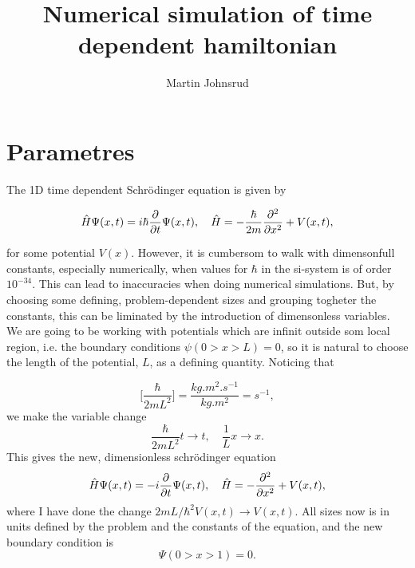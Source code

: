 \documentclass{article}
\title{Numerical simulation of time dependent hamiltonian}
\author{Martin Johnsrud}
\begin{document}
\maketitle

\section*{Parametres}

    The 1D time dependent Schrödinger equation is given by

    \begin{equation*}
        \hat H \Psi(x, t) = i \hbar \pdv{t} \Psi(x, t), \quad \hat H = -\frac{\hbar}{2m}\pdv[2]{x} + V(x, t),
    \end{equation*}

    for some potential $V(x)$. However, it is cumbersom to walk with dimensonfull constants, especially numerically, when values for $\hbar$ in the si-system is of order $10^{-34}$. This can lead to inaccuracies when doing numerical simulations. But, by choosing some defining, problem-dependent sizes and grouping togheter the constants, this can be liminated by the introduction of dimensonless variables. We are going to be working with potentials which are infinit outside som local region, i.e. the boundary conditions $\psi(0>x>L) = 0$, so it is natural to choose the length of the potential, $L$, as a defining quantity. Noticing that

    \begin{equation*}
        \bigg[\frac{\hbar}{2 m L^2} \bigg] = \frac{\si{kg.m^2.s^{-1}}}{\si{kg.m^2}} = \si{s^{-1}},
    \end{equation*}
    we make the variable change
    \begin{equation*}
        \frac{\hbar}{2 m L^2}t \rightarrow t, \quad \frac{1}{L}x \rightarrow x.
    \end{equation*}
    This gives the new, dimensionless schrödinger equation
    \begin{equation}
        \hat H \Psi(x, t) = -i \pdv{t} \Psi(x, t), \quad \hat H = -\pdv[2]{x} + V(x, t),
        \label{time_depend}
    \end{equation}
    where I have done the change $2mL/\hbar^2V(x, t) \rightarrow V(x, t)$. All sizes now is in units defined by the problem and the constants of the equation, and the new boundary condition is 
    \begin{equation*}
        \Psi(0>x>1) = 0.
    \end{equation*}
\end{document}
